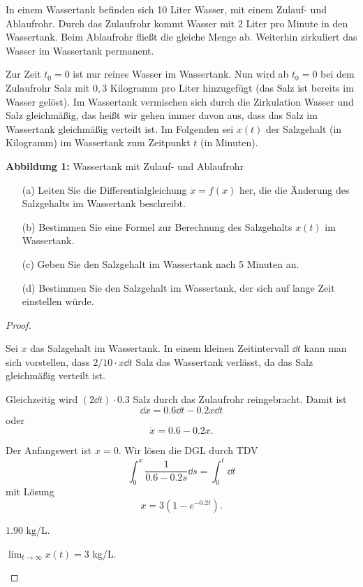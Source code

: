 \begin{Problem}
	In einem Wassertank befinden sich 10 Liter Wasser, mit einem Zulauf- und Ablaufrohr. Durch das Zulaufrohr kommt Wasser mit 2 Liter pro Minute in den Wassertank. Beim Ablaufrohr fließt die gleiche Menge ab. Weiterhin zirkuliert das Wasser im Wassertank permanent.

Zur Zeit \(t_0 = 0\) ist nur reines Wasser im Wassertank. Nun wird ab \(t_0 = 0\) bei dem Zulaufrohr Salz mit \(0{,}3\) Kilogramm pro Liter hinzugefügt (das Salz ist bereits im Wasser gelöst). Im Wassertank vermischen sich durch die Zirkulation Wasser und Salz gleichmäßig, das heißt wir gehen immer davon aus, dass das Salz im Wassertank gleichmäßig verteilt ist. Im Folgenden sei \(x(t)\) der Salzgehalt (in Kilogramm) im Wassertank zum Zeitpunkt \(t\) (in Minuten).

\begin{center}
\end{center}

\textbf{Abbildung 1:} Wassertank mit Zulauf- und Ablaufrohr

\begin{enumerate}
    \item[(a)] Leiten Sie die Differentialgleichung \(\dot{x} = f(x)\) her, die die Änderung des Salzgehalts im Wassertank beschreibt.
    \item[(b)] Bestimmen Sie eine Formel zur Berechnung des Salzgehalts \(x(t)\) im Wassertank.
    \item[(c)] Geben Sie den Salzgehalt im Wassertank nach 5 Minuten an.
    \item[(d)] Bestimmen Sie den Salzgehalt im Wassertank, der sich auf lange Zeit einstellen würde.
\end{enumerate}
\end{Problem}
\begin{proof}
	\begin{parts}
	\item Sei $x$ das Salzgehalt im Wassertank. In einem kleinen Zeitintervall $\dd{t}$ kann man sich vorstellen, dass $2 / 10 \cdot x\dd{t}$ Salz das Wassertank verlässt, da das Salz gleichmäßig verteilt ist.

		Gleichzeitig wird $(2\dd{t})\cdot 0.3$ Salz durch das Zulaufrohr reingebracht. Damit ist
		\[
			\dd{x} = 0.6 \dd{t} - 0.2 x\dd{t}
		\]
		oder
		\[
			\dot{x} = 0.6 - 0.2x
		.\] 
	\item Der Anfangswert ist $x = 0$. Wir l\"{o}sen die DGL durch TDV
		\[
			\int_0^x \frac{1}{0.6-0.2s}\dd{s} = \int_0^t \dd{t}
		\]
		mit L\"{o}sung
		\[
			x=3(1-e^{-0.2t})
		.\] 
	\item $1.90$ kg/L.
	\item $\displaystyle \lim_{t \to \infty} x(t) = 3$ kg/L.
	\end{parts}
\end{proof}
